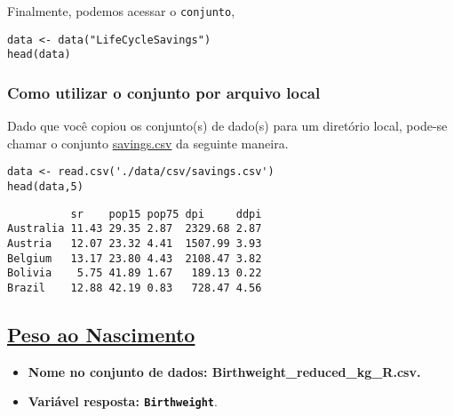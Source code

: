 \documentclass[11pt]{article}
\begin{document}
Finalmente, podemos acessar o \texttt{conjunto},
\begin{verbatim}
data <- data("LifeCycleSavings")
head(data)
\end{verbatim}
\subsubsection{Como utilizar o conjunto por arquivo local}
\label{sec:orgbd8ce56}

Dado que você copiou os conjunto(s) de dado(s) para um diretório
local, pode-se chamar o conjunto \href{https://drive.google.com/file/d/1j2K7J1rb3V2Qr\_t0rcBhA6tyuqh88AjY/view?usp=sharing}{savings.csv} da seguinte maneira.

\begin{verbatim}
data <- read.csv('./data/csv/savings.csv')
head(data,5)
\end{verbatim}

\begin{verbatim}
          sr    pop15 pop75 dpi     ddpi
Australia 11.43 29.35 2.87  2329.68 2.87
Austria   12.07 23.32 4.41  1507.99 3.93
Belgium   13.17 23.80 4.43  2108.47 3.82
Bolivia    5.75 41.89 1.67   189.13 0.22
Brazil    12.88 42.19 0.83   728.47 4.56
\end{verbatim}
\clearpage

\subsection{\href{https://www.sheffield.ac.uk/mash/statistics/datasets}{Peso ao Nascimento}}
\label{sec:orgd44f30f}
\begin{itemize}
\item \textbf{Nome no conjunto de dados: \textbf{Birthweight_reduced_kg_R.csv}.}
\item \textbf{Variável resposta: \texttt{Birthweight}}.
\end{itemize}
\end{document}
